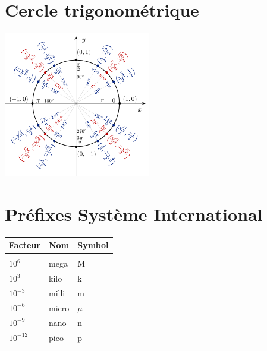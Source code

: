 \section*{Cercle trigonométrique}
% 
\begin{center}
    \includegraphics[width=0.48\textwidth]{fig/unit_circle.png}    
\end{center}

\section*{Préfixes Système International}
\begin{center}
\begin{tabular}{lll}
Facteur    & Nom   & Symbol \\\hline\\[-1em]
$10^{6}$   & mega  & M      \\
$10^3$     & kilo  & k      \\
$10^{-3}$  & milli & m      \\
$10^{-6}$  & micro & $\mu$  \\
$10^{-9}$  & nano  & n      \\
$10^{-12}$ & pico  & p     
\end{tabular}
\end{center}